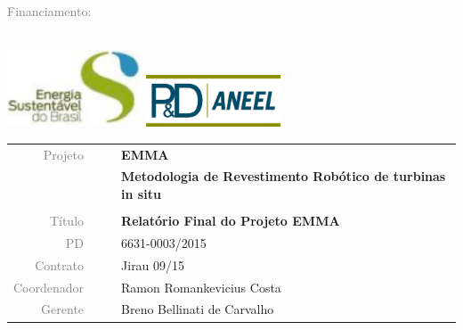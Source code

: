 \textcolor{gray}{Financiamento: } \\ 
\\
\begin{minipage}{\textwidth}
	\centering
	
	\includegraphics[width=0.3\textwidth]{logo/esbr-logo}
	\includegraphics[width=0.3\textwidth]{logo/aneel-logo}

	
\end{minipage}

\vspace{4cm}

\begin{table}[ht!]
	\centering
	\begin{tabular}{r l|l p{12cm} }
		\textcolor{gray}{Projeto} &&& \textbf{\Large EMMA}\\
			&&& \textbf{Metodologia de Revestimento Robótico de turbinas in situ}\\
			&&& \\
		\textcolor{gray}{Título} &&& \textbf{Relatório Final do Projeto EMMA}\\
		\textcolor{gray}{PD} &&& 6631-0003/2015 \\
		\textcolor{gray}{Contrato} &&& Jirau 09/15\\
		\textcolor{gray}{Coordenador} &&& Ramon Romankevicius Costa \\
		\textcolor{gray}{Gerente} &&& Breno Bellinati de Carvalho \\
	\end{tabular}
\end{table}


\cleardoublepage


